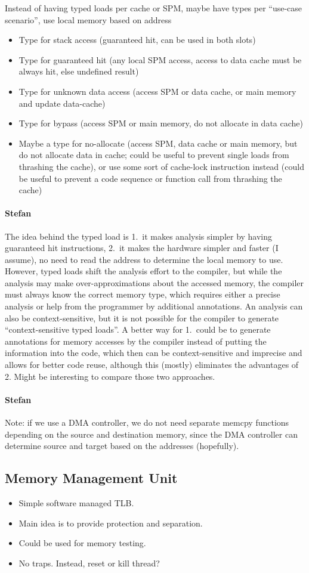 \documentclass{IEEEtran}
\newcommand{\comment}[3]{\paragraph*{\textbf{#1}}{\color{#3}#2}}
\newcommand{\stefan}[1]{\comment{Stefan}{#1}{RoyalPurple}}
\begin{document}
Instead of having typed loads per cache or SPM, maybe have types per ``use-case scenario'', use local memory based on address
\begin{itemize}
\item Type for stack access (guaranteed hit, can be used in both slots)
\item Type for guaranteed hit (any local SPM access, access to data cache must be always hit, else undefined result)
\item Type for unknown data access (access SPM or data cache, or main memory and update data-cache)
\item Type for bypass (access SPM or main memory, do not allocate in data cache)
\item Maybe a type for no-allocate (access SPM, data cache or main memory, but do not allocate data in cache; could be useful to prevent
single loads from thrashing the cache), or use some sort of cache-lock instruction instead (could be useful to prevent a code sequence or function call from
thrashing the cache)
\end{itemize}

\stefan{
The idea behind the typed load is 1.~it makes analysis simpler by having guaranteed hit instructions, 2.~it makes the hardware
simpler and faster (I assume), no need to read the address to determine the local memory to use. 
However, typed loads shift the analysis effort to the compiler, but while the analysis may make over-approximations about the accessed
memory, the compiler must always know the correct memory type, which requires either a precise analysis or help from the programmer by
additional annotations. An analysis can also be context-sensitive, but it is not possible for the compiler to generate ``context-sensitive
typed loads''. A better way for 1.~could be to generate annotations for memory accesses by the compiler instead of putting the
information into the code, which then can be context-sensitive and imprecise and allows for better code reuse, although this (mostly) eliminates the advantages of 2.
Might be interesting to compare those two approaches.
}

\stefan{Note: if we use a DMA controller, we do not need separate memcpy functions depending on the source and destination memory, since the
DMA controller can determine source and target based on the addresses (hopefully).
}

\subsection{Memory Management Unit}
\begin{itemize}
  \item Simple software managed TLB.
  \item Main idea is to provide protection and separation.
  \item Could be used for memory testing.
  \item No traps. Instead, reset or kill thread?
\end{itemize}
\end{document}

